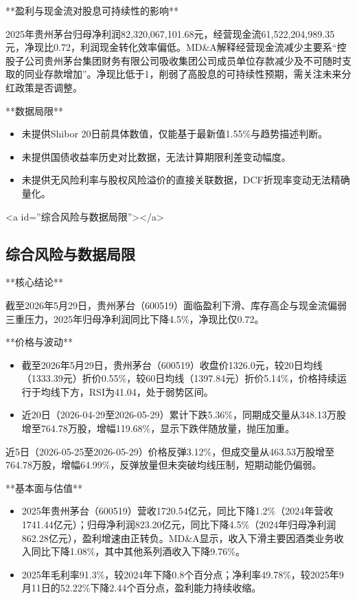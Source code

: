 \documentclass[12pt,a4paper]{article}
\begin{document}
**盈利与现金流对股息可持续性的影响**

2025年贵州茅台归母净利润82,320,067,101.68元，经营现金流61,522,204,989.35元，净现比0.72，利润现金转化效率偏低。MD\&A解释经营现金流减少主要系“控股子公司贵州茅台集团财务有限公司吸收集团公司成员单位存款减少及不可随时支取的同业存款增加”。净现比低于1，削弱了高股息的可持续性预期，需关注未来分红政策是否调整。

**数据局限**
\begin{itemize}
\item 未提供Shibor 20日前具体数值，仅能基于最新值1.55\%与趋势描述判断。
\item 未提供国债收益率历史对比数据，无法计算期限利差变动幅度。
\item 未提供无风险利率与股权风险溢价的直接关联数据，DCF折现率变动无法精确量化。
\end{itemize}

<a id=''综合风险与数据局限''></a>

\subsection{ 综合风险与数据局限}

**核心结论**

截至2026年5月29日，贵州茅台（600519）面临盈利下滑、库存高企与现金流偏弱三重压力，2025年归母净利润同比下降4.5\%，净现比仅0.72。

**价格与波动**
\begin{itemize}
\item 截至2026年5月29日，贵州茅台（600519）收盘价1326.0元，较20日均线（1333.39元）折价0.55\%，较60日均线（1397.84元）折价5.14\%，价格持续运行于均线下方，RSI为41.04，处于弱势区间。
\item 近20日（2026-04-29至2026-05-29）累计下跌5.36\%，同期成交量从348.13万股增至764.78万股，增幅119.68\%，显示下跌伴随放量，抛压加重。
\end{itemize}

近5日（2026-05-25至2026-05-29）价格反弹3.12\%，但成交量从463.53万股增至764.78万股，增幅64.99\%，反弹放量但未突破均线压制，短期动能仍偏弱。

**基本面与估值**
\begin{itemize}
\item 2025年贵州茅台（600519）营收1720.54亿元，同比下降1.2\%（2024年营收1741.44亿元）；归母净利润823.20亿元，同比下降4.5\%（2024年归母净利润862.28亿元），盈利增速由正转负。MD\&A显示，收入下滑主要因酒类业务收入同比下降1.08\%，其中其他系列酒收入下降9.76\%。
\item 2025年毛利率91.3\%，较2024年下降0.8个百分点；净利率49.78\%，较2025年9月11日的52.22\%下降2.44个百分点，盈利能力持续收缩。
\end{itemize}
\end{document}
